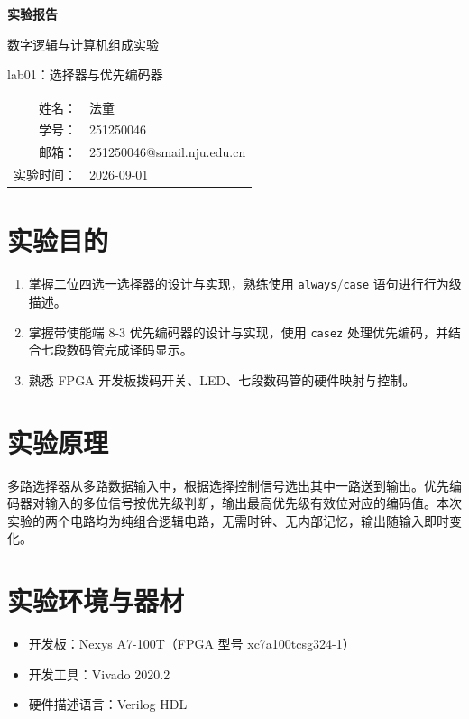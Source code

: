 \documentclass[12pt, a4paper]{ctexart}
\makeatletter
\newcommand{\coursename}{数字逻辑与计算机组成实验}
\newcommand{\expname}{lab01：选择器与优先编码器}   %
\newcommand{\expdate}{2026-09-01}                 %
\newcommand{\stuname}{法童}
\newcommand{\stuid}{251250046}
\newcommand{\stumail}{251250046@smail.nju.edu.cn}
\makeatother
\begin{document}
\begin{titlepage}
    \centering
    \vspace*{4cm}
    {\Huge\bfseries 实验报告\par}
    \vspace{1.5cm}
    {\Large \coursename\par}
    \vspace{0.8cm}
    {\Large \expname\par}
    \vspace{3cm}
    {\large
    \begin{tabular}{rl}
        姓名： & \stuname \\
        学号： & \stuid \\
        邮箱： & \stumail \\
        实验时间： & \expdate \\
    \end{tabular}\par}
\end{titlepage}

\section{实验目的}
\begin{enumerate}
    \item 掌握二位四选一选择器的设计与实现，熟练使用 \texttt{always}/\texttt{case} 语句进行行为级描述。
    \item 掌握带使能端 8-3 优先编码器的设计与实现，使用 \texttt{casez} 处理优先编码，并结合七段数码管完成译码显示。
    \item 熟悉 FPGA 开发板拨码开关、LED、七段数码管的硬件映射与控制。
\end{enumerate}

\section{实验原理}
多路选择器从多路数据输入中，根据选择控制信号选出其中一路送到输出。优先编码器对输入的多位信号按优先级判断，输出最高优先级有效位对应的编码值。本次实验的两个电路均为纯组合逻辑电路，无需时钟、无内部记忆，输出随输入即时变化。

\section{实验环境与器材}
\begin{itemize}
    \item 开发板：Nexys A7-100T（FPGA 型号 xc7a100tcsg324-1）
    \item 开发工具：Vivado 2020.2
    \item 硬件描述语言：Verilog HDL
\end{itemize}
\end{document}

